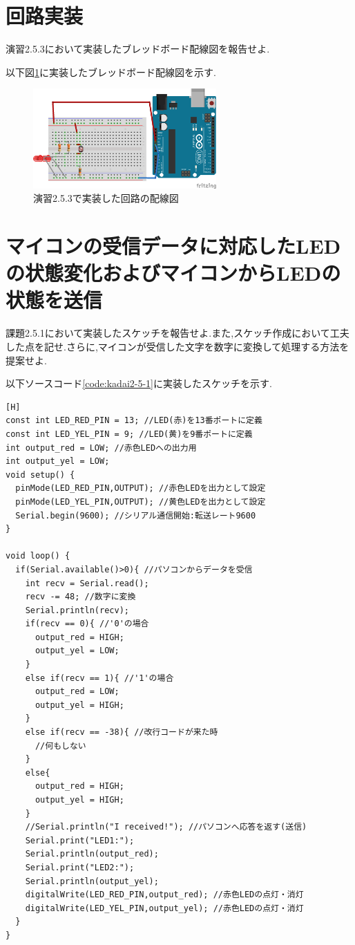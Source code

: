 \documentclass{jarticle}
\begin{document}
\section{回路実装}
演習2.5.3において実装したブレッドボード配線図を報告せよ.

以下図\ref{fig:2-5-3bread}に実装したブレッドボード配線図を示す.


\begin{figure}[H]
\begin{center}
\includegraphics[width=7.0cm]{images/2-5-3bread.png}
\caption{演習2.5.3で実装した回路の配線図}
\label{fig:2-5-3bread}
\end{center}
\end{figure}

\section{マイコンの受信データに対応したLEDの状態変化およびマイコンからLEDの状態を送信}
課題2.5.1において実装したスケッチを報告せよ.また,スケッチ作成において工夫した点を記せ.さらに,マイコンが受信した文字を数字に変換して処理する方法を提案せよ.

以下ソースコード\ref{code:kadai2-5-1}に実装したスケッチを示す.
\begin{lstlisting}[caption = 課題2.5.1,label=code:kadai2-5-1][H]
const int LED_RED_PIN = 13; //LED(赤)を13番ポートに定義
const int LED_YEL_PIN = 9; //LED(黄)を9番ポートに定義
int output_red = LOW; //赤色LEDへの出力用
int output_yel = LOW;
void setup() {
  pinMode(LED_RED_PIN,OUTPUT); //赤色LEDを出力として設定
  pinMode(LED_YEL_PIN,OUTPUT); //黄色LEDを出力として設定
  Serial.begin(9600); //シリアル通信開始:転送レート9600
}

void loop() {
  if(Serial.available()>0){ //パソコンからデータを受信
    int recv = Serial.read();
    recv -= 48; //数字に変換
    Serial.println(recv);
    if(recv == 0){ //'0'の場合
      output_red = HIGH;
      output_yel = LOW;
    }
    else if(recv == 1){ //'1'の場合
      output_red = LOW;
      output_yel = HIGH;
    }
    else if(recv == -38){ //改行コードが来た時
      //何もしない
    }
    else{
      output_red = HIGH;
      output_yel = HIGH;
    }
    //Serial.println("I received!"); //パソコンへ応答を返す(送信)
    Serial.print("LED1:");
    Serial.println(output_red);
    Serial.print("LED2:");
    Serial.println(output_yel);
    digitalWrite(LED_RED_PIN,output_red); //赤色LEDの点灯・消灯
    digitalWrite(LED_YEL_PIN,output_yel); //赤色LEDの点灯・消灯
  }
}
\end{lstlisting}
\end{document}
